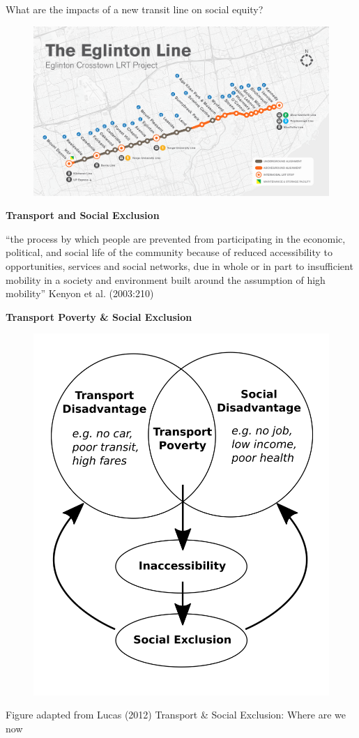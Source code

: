 \documentclass[aspectratio=169]{beamer}
\begin{document}
\begin{frame}
	
	What are the impacts of a new transit line on social equity?
	
	
	\begin{figure}
		\centering
		\includegraphics[width=0.74\linewidth]{images/crosstown.png}
	\end{figure}
	
	
\end{frame}



\begin{frame}
	
	\textbf{Transport and Social Exclusion}
	
	“the process by which people are prevented from
	participating in the economic, political, and social
	life of the community because of reduced
	accessibility to opportunities, services and social
	networks, due in whole or in part to insufficient
	mobility in a society and environment built around
	the assumption of high mobility” Kenyon et al. (2003:210)
	
\end{frame}






\begin{frame}
	
	\textbf{Transport Poverty \& Social Exclusion}
	
	\begin{figure}
		\centering
		\includegraphics[width=0.44\linewidth]{images/tpov.png}
	\end{figure}
	
	\tiny Figure adapted from Lucas (2012) Transport \& Social Exclusion: Where are we now
	
\end{frame}
\end{document}
